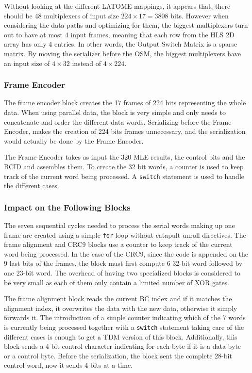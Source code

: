 \begin{itemize}
Without looking at the different LATOME mappings, it appears that, there should be 48 multiplexers of input size \(224\times17=3808\) bits. However when considering the data paths and optimizing for them, the biggest multiplexers turn out to have at most 4 input frames, meaning that each row from the HLS 2D array has only 4 entries. In other words, the Output Switch Matrix is a sparse matrix. By moving the serializer before the OSM, the biggest multiplexers have an input size of \(4\times32\) instead of \(4\times224\).

\subsubsection{Frame Encoder}

The frame encoder block creates the 17 frames of 224 bits representing the whole data. When using parallel data, the block is very simple and only needs to concatenate and order the different data words. Serializing before the Frame Encoder, makes the creation of 224 bits frames unnecessary, and the serialization would actually be done by the Frame Encoder.

The Frame Encoder takes as input the 320 MLE results, the control bits and the BCID and assembles them. To create the 32 bit words, a counter is used to keep track of the current word being processed. A \verb|switch| statement is used to handle the different cases.


\subsubsection{Impact on the Following Blocks}

The seven sequential cycles needed to process the serial words making up one frame are created using a simple \verb|for| loop without catapult unroll directives. The frame alignment and CRC9 blocks use a counter to keep track of the current word being processed. In the case of the CRC9, since the code is appended on the 9 last bits of the frames, the block must first compute 6 32-bit word followed by one 23-bit word. The overhead of having two specialized blocks is considered to be very small as each of them only contain a limited number of XOR gates.

The frame alignment block reads the current BC index and if it matches the alignment index, it overwrites the data with the new data, otherwise it simply forwards it. The introduction of a simple counter indicating which of the 7 words is currently being processed together with a \verb|switch| statement taking care of the different cases is enough to get a TDM version of this block. Additionally, this block sends a 4 bit control character indicating for each byte if it is a data byte or a control byte. Before the serialization, the block sent the complete 28-bit control word, now it sends 4 bits at a time.


\end{itemize}
